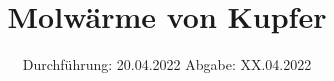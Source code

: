 

\subject{V47}
\title{Molwärme von Kupfer}
\date{%
  Durchführung: 20.04.2022
  \hspace{3em}
  Abgabe: XX.04.2022
}



\maketitle
\thispagestyle{empty}
\tableofcontents
\newpage






\printbibliography{}


